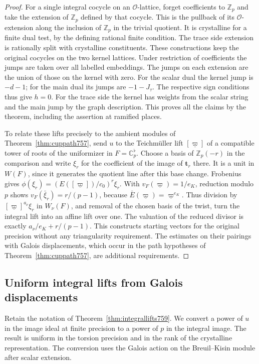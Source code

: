\documentclass[a4paper,11pt]{article}
\theoremstyle{definition}
\theoremstyle{remark}
\newcommand{\ZZ}{\mathbb Z}\newcommand{\ord}{\operatorname{ord}}
\numberwithin{equation}{section}
\begin{document}
\begin{proof}
For a single integral cocycle on an \(\mathcal O\)-lattice,
forget coefficients to \(\ZZ_p\) and take the extension of
\(\ZZ_p\) defined by that cocycle. This is the pullback of its
\(\mathcal O\)-extension along the inclusion of \(\ZZ_p\) in
the trivial quotient. It is crystalline for a finite dual
test, by the defining rational finite condition. The trace
side extension is rationally split with crystalline
constituents. These constructions keep the original cocycles
on the two kernel lattices. Under restriction of coefficients
the jumps are taken over all labelled embeddings. The jumps
on each extension are the union of those on the kernel with
zero. For the scalar dual the kernel jump is \(-d-1\); for
the main dual its jumps are \(-1-J_\tau\). The respective
sign conditions thus give \(h=0\). For the trace side the
kernel has weights from the scalar string and the main jump
by the graph description. This proves all the claims by the
theorem, including the assertion at ramified places.

To relate these lifts precisely to the ambient modules of
Theorem~\ref{thm:cuppath757}, send \(u\) to the Teichm\"uller
lift \([\underline\varpi]\) of a compatible tower of roots
of the uniformizer in \(F=\mathbb C_p^\flat\). Choose a basis
of \(\ZZ_p(-r)\) in the comparison and write \(\xi_r\) for the
coefficient of the image of \(\mathbf t_r\) there. It is a
unit in \(W(F)\), since it generates the quotient line after
this base change. Frobenius gives
\(\phi(\xi_r)=(E([\underline\varpi])/c_0)^r\xi_r\).
With \(v_F(\underline\varpi)=1/e_K\), reduction modulo \(p\)
shows \(v_F(\bar\xi_r)=r/(p-1)\), because
\(\bar E(\underline\varpi)=\underline\varpi^{e_K}\).
Thus division by \([\underline\varpi]^{a_\nu}\xi_r\) in
\(W_\nu(F)\), and removal of the chosen basis of the twist,
turn the integral lift into an affine lift over one. The
valuation of the reduced divisor is exactly
\(a_\nu/e_K+r/(p-1)\). This constructs starting vectors for
the original precision without any triangularity requirement.
The estimates on their pairings with Galois displacements,
which occur in the path hypotheses of
Theorem~\ref{thm:cuppath757}, are additional requirements.
\end{proof}
\clearpage

\subsection{Uniform integral lifts from Galois displacements}
\label{sec:uniformlifts760}
Retain the notation of Theorem~\ref{thm:integrallifts759}.
We convert a power of \(u\) in the image ideal at finite
precision to a power of \(p\) in the integral image. The
result is uniform in the torsion precision and in the rank
of the crystalline representation. The conversion uses
the Galois action on the Breuil--Kisin module after scalar
extension.
\end{document}
